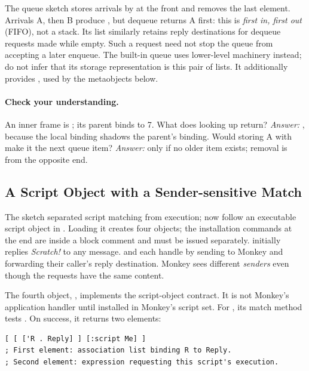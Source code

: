 The queue sketch stores arrivals by  at the front and removes
the last element. Arrivals A, then B produce , but dequeue
returns A first: this is \emph{first in, first out} (FIFO), not a stack. Its 
list similarly retains reply destinations for dequeue requests made
while empty. Such a request need not stop the queue from accepting a
later enqueue. The built-in queue uses lower-level machinery instead;
do not infer that its storage representation is this pair of lists.
It additionally provides , used by the metaobjects below.

\paragraph{Check your understanding.}
An inner frame is ; its parent binds  to 7.
What does looking up  return? \emph{Answer:} ,
because the local binding shadows the parent's binding.
Would storing A with  make it the next queue item?
\emph{Answer:} only if no older item exists; removal is from the
opposite end.

\subsection{A Script Object with a Sender-sensitive Match}
\label{sec:user-script-reading}

The sketch separated script matching from execution; now follow an
executable script object in .
Loading it creates four objects; the installation commands at the end
are inside a block comment and must be issued separately.
 initially replies \emph{Scratch!} to any message.
 and  each handle 
by sending  to Monkey and forwarding their caller's
reply destination. Monkey sees different \emph{senders}
even though the requests have the same content.

The fourth object, , implements the script-object
contract. It is not Monkey's application handler until installed
in Monkey's script set. For , its match method tests
. On success, it returns two elements:

\begin{codeblock}
\begin{lstlisting}
[ [ ['R . Reply] ] [:script Me] ]
; First element: association list binding R to Reply.
; Second element: expression requesting this script's execution.
\end{lstlisting}
\end{codeblock}


